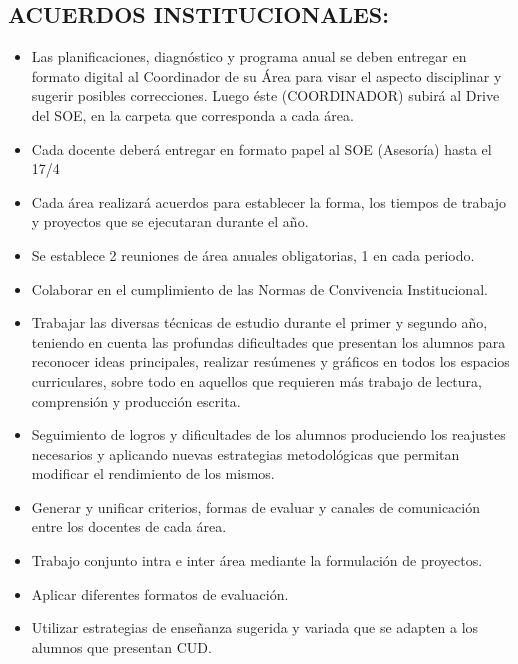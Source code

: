 \documentclass[a4paper]{article}
\begin{document}
\subsection*{ACUERDOS INSTITUCIONALES:}
\begin{itemize}
    
    \item Las planificaciones, diagnóstico y programa anual se deben entregar en formato digital al Coordinador de su Área para visar el aspecto disciplinar y sugerir posibles correcciones. Luego éste (COORDINADOR) subirá al Drive del SOE, en la carpeta que corresponda a cada área. 

    \item Cada docente deberá entregar en formato papel al SOE (Asesoría) hasta el 17/4 

    \item Cada área realizará acuerdos para establecer la forma, los tiempos de trabajo y proyectos que se ejecutaran durante el año. 

    \item Se establece 2 reuniones de área anuales obligatorias, 1 en cada periodo. 

    \item Colaborar en el cumplimiento de las Normas de Convivencia Institucional. 

    \item Trabajar las diversas técnicas de estudio durante el primer y segundo año, teniendo en cuenta las profundas dificultades que presentan los alumnos para reconocer ideas principales, realizar resúmenes y gráficos en todos los espacios curriculares, sobre todo en aquellos que requieren más trabajo de lectura, comprensión y producción escrita.  

    \item Seguimiento de logros y dificultades de los alumnos produciendo los reajustes necesarios y aplicando nuevas estrategias metodológicas que permitan modificar el rendimiento de los mismos. 

    \item Generar y unificar criterios, formas de evaluar y canales de comunicación entre los docentes de cada área. 

    \item Trabajo conjunto intra e inter área mediante la formulación de proyectos. 

    \item Aplicar diferentes formatos de evaluación. 

    \item Utilizar estrategias de enseñanza sugerida y variada que se adapten a los alumnos que presentan CUD. 


\end{itemize}
\end{document}
